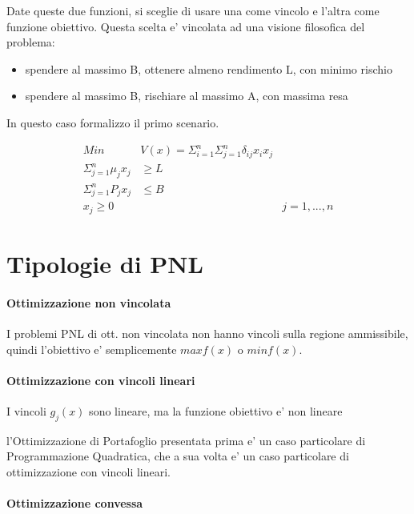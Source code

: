 Date queste due funzioni, si sceglie di usare una come vincolo e l'altra come funzione obiettivo.
Questa scelta e' vincolata ad una visione filosofica del problema:

\begin{itemize}
    \item spendere al massimo B, ottenere almeno rendimento L, con minimo rischio
    \item spendere al massimo B, rischiare al massimo A, con massima resa
\end{itemize}

In questo caso formalizzo il primo scenario.

\begin{align*}
    Min & V(x) = \Sigma ^ n _ {i=1} \Sigma ^ n _ {j=1} \delta _ {ij} x_ i x _ j \\
    \Sigma ^ n _ {j=1} \mu _ j x _ j &\geq L \\
    \Sigma ^ n _ {j=1} P _ j x _ j &\leq B \\
    x _ j \geq 0 && j = 1,...,n
\end{align*}

\section{Tipologie di PNL}

\paragraph{Ottimizzazione non vincolata}

I problemi PNL di ott. non vincolata non hanno vincoli sulla regione ammissibile, quindi l'obiettivo e' semplicemente $max f(x)$ o $min f(x)$.

\paragraph{Ottimizzazione con vincoli lineari}

I vincoli $g_j(x)$ sono lineare, ma la funzione obiettivo e' non lineare

l'Ottimizzazione di Portafoglio presentata prima e' un caso particolare di Programmazione Quadratica, che a sua volta e' un caso particolare di ottimizzazione con vincoli lineari.

\paragraph{Ottimizzazione convessa}

